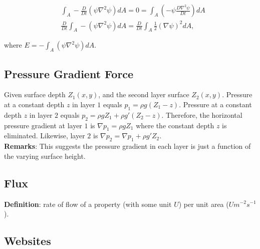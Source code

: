 \begin{equation}
   \begin{aligned}
      & \int_A -\frac{D}{Dt} (\psi \nabla^2\psi) dA= 0= \int_A \left( -\psi \frac{D\nabla^2\psi}{Dt} \right) dA \\
      & \frac{D}{Dt} \int_A -(\psi \nabla^2\psi) dA= \frac{D}{Dt} \int_A \frac{1}{2} (\nabla\psi)^2 dA,
   \end{aligned}
\end{equation}

where $E= -\int_A (\psi \nabla^2\psi) dA$.



\subsection{Pressure Gradient Force}
Given surface depth $Z_1(x,y)$, and the second layer surface $Z_2(x,y)$.
Pressure at a constant depth $z$ in layer $1$ equals $p_1= \rho g (Z_1- z)$.
Pressure at a constant depth $z$ in layer $2$ equals $p_2= \rho g Z_1 + \rho g' (Z_2- z)$.
Therefore, the horizontal pressure gradient at layer $1$ is $\nabla p_1= \rho g Z_1$ where the constant depth $z$ is eliminated.
Likewise, layer $2$ is $\nabla p_2= \nabla p_1 + \rho g' Z_2$. \\

{\bf Remarks}: This suggests the pressure gradient in each layer is just a function of the varying surface height.


\subsection{Flux}
{\bf Definition}: rate of flow of a property (with some unit $U$) per unit area ($U m^{-2}s^{-1}$).








%
\subsection{Websites}


